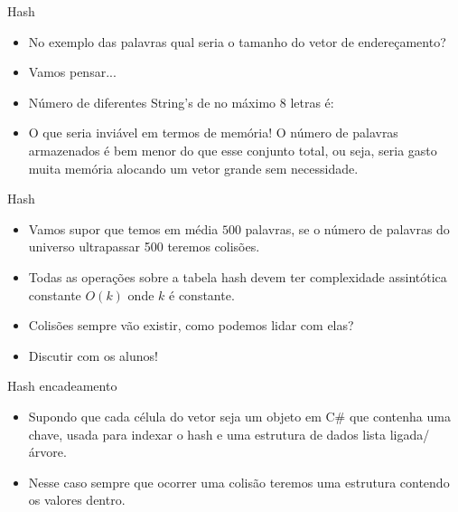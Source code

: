 \begin{frame}
	\begin{block}{Hash}
		\begin{itemize}
			\item No exemplo das palavras qual seria o tamanho do vetor de endereçamento?
	
			\item Vamos pensar... 
			
			\item Número de diferentes String’s de no máximo $8$ letras é:
			
			\item O que seria inviável em termos de memória! O número de palavras armazenados é bem menor do que esse conjunto total, ou seja, seria gasto muita memória alocando um vetor grande sem necessidade.
		\end{itemize}
	\end{block}
\end{frame}

\begin{frame}
	\begin{block}{Hash}
		\begin{itemize}
			\item Vamos supor que temos em média $500$ palavras, se o número de palavras do universo ultrapassar 500 teremos colisões.

			\item Todas as operações sobre a tabela hash devem ter complexidade assintótica constante $O(k)$ onde $k$ é constante.
			
			\item Colisões sempre vão existir, como podemos lidar com elas?
			
			\item Discutir com os alunos!
		\end{itemize}
	\end{block}
\end{frame}

\begin{frame}
	\begin{block}{Hash encadeamento}
		\begin{itemize}
			\item Supondo que cada célula do vetor seja um objeto em C\# que contenha uma chave, usada para indexar o hash e uma estrutura de dados lista ligada/árvore.

			\item Nesse caso sempre que ocorrer uma colisão teremos uma estrutura contendo os valores dentro.
		\end{itemize}
	\end{block}
\end{frame}

